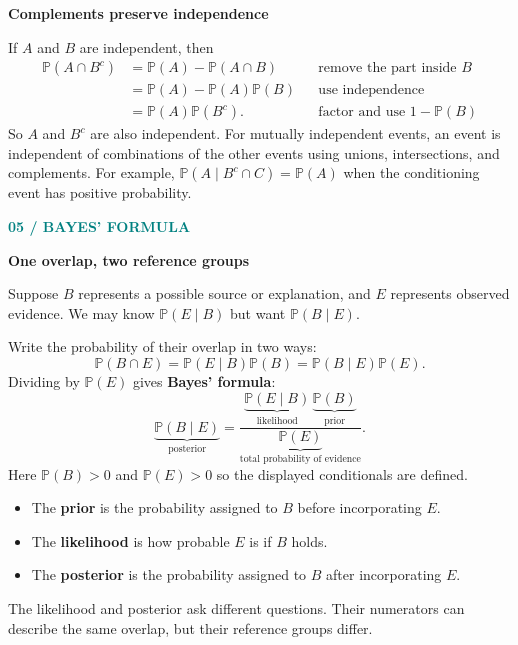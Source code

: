 \documentclass[11pt,letterpaper]{article}
\newcommand{\Pp}{\mathbb{P}}
\newcommand{\sectionpage}[2]{\textcolor{teal}{\small\textbf{#1}}\par{\LARGE\bfseries\color{ink}#2}\par\medskip}
\newcommand{\minihead}[1]{\par\smallskip\textbf{\color{ink}#1}\par}
\begin{document}
\minihead{Complements preserve independence}
If $A$ and $B$ are independent, then
\begin{align*}
\Pp(A\cap B^c)
&=\Pp(A)-\Pp(A\cap B) &&\text{remove the part inside }B\\
&=\Pp(A)-\Pp(A)\Pp(B) &&\text{use independence}\\
&=\Pp(A)\Pp(B^c). &&\text{factor and use }1-\Pp(B)
\end{align*}
So $A$ and $B^c$ are also independent. For mutually independent events, an event is independent of combinations of the other events using unions, intersections, and complements. For example,
$\Pp(A\mid B^c\cap C)=\Pp(A)$ when the conditioning event has positive probability.

\newpage
\sectionpage{05 / BAYES' FORMULA}{One overlap, two reference groups}
Suppose $B$ represents a possible source or explanation, and $E$ represents observed evidence. We may know $\Pp(E\mid B)$ but want $\Pp(B\mid E)$.

Write the probability of their overlap in two ways:
\[
\Pp(B\cap E)=\Pp(E\mid B)\Pp(B)=\Pp(B\mid E)\Pp(E).
\]
Dividing by $\Pp(E)$ gives \textbf{Bayes' formula}:
\[
\boxed{\underbrace{\Pp(B\mid E)}_{\text{posterior}}
=\frac{\underbrace{\Pp(E\mid B)}_{\text{likelihood}}\,
\underbrace{\Pp(B)}_{\text{prior}}}{\underbrace{\Pp(E)}_{\text{total probability of evidence}}}.}
\]
Here $\Pp(B)>0$ and $\Pp(E)>0$ so the displayed conditionals are defined.
\begin{itemize}
\item The \textbf{prior} is the probability assigned to $B$ before incorporating $E$.
\item The \textbf{likelihood} is how probable $E$ is if $B$ holds.
\item The \textbf{posterior} is the probability assigned to $B$ after incorporating $E$.
\end{itemize}
The likelihood and posterior ask different questions. Their numerators can describe the same overlap, but their reference groups differ.
\end{document}
